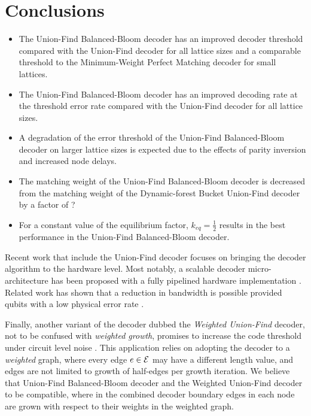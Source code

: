\chapter{Conclusions}


\begin{itemize}
  \item The Union-Find Balanced-Bloom decoder has an improved decoder threshold compared with the Union-Find decoder for all lattice sizes and a comparable threshold to the Minimum-Weight Perfect Matching decoder for small lattices.
  \item The Union-Find Balanced-Bloom decoder has an improved decoding rate at the threshold error rate compared with the Union-Find decoder for all lattice sizes. 
  \item A degradation of the error threshold of the Union-Find Balanced-Bloom decoder on larger lattice sizes is expected due to the effects of parity inversion and increased node delays. 
  \item The matching weight of the Union-Find Balanced-Bloom decoder is decreased from the matching weight of the Dynamic-forest Bucket Union-Find decoder by a factor of ?
  \item For a constant value of the equilibrium factor, $k_{eq}=\frac{1}{2}$ results in the best performance in the Union-Find Balanced-Bloom decoder.  
\end{itemize}

Recent work that include the Union-Find decoder focuses on bringing the decoder algorithm to the hardware level. Most notably, a scalable decoder micro-architecture has been proposed with a fully pipelined hardware implementation \cite{das2020scalable}. Related work has shown that a reduction in bandwidth is possible provided qubits with a low physical error rate \cite{delfosse2020hierarchical}. 

Finally, another variant of the decoder dubbed the \emph{Weighted Union-Find} decoder, not to be confused with \emph{weighted growth}, promises to increase the code threshold under circuit level noise \cite{huang2020fault}. This application relies on adopting the decoder to a \emph{weighted} graph, where every edge $e\in\mathcal{E}$ may have a different length value, and edges are not limited to growth of half-edges per growth iteration. We believe that Union-Find Balanced-Bloom decoder and the Weighted Union-Find decoder to be compatible, where in the combined decoder boundary edges in each node are grown with respect to their weights in the weighted graph. 

